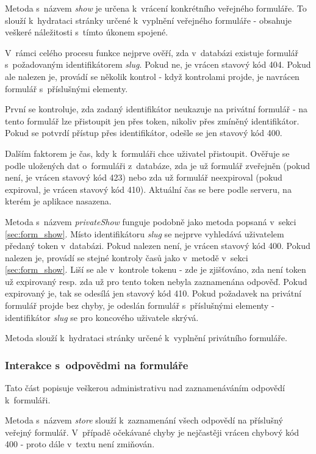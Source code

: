 			\label{sec:form_show}
			Metoda s~názvem \textit{show} je určena k~vrácení konkrétního veřejného formuláře. To slouží k~hydrataci stránky určené k~vyplnění veřejného formuláře - obsahuje veškeré náležitosti s~tímto úkonem spojené.
			
			V~rámci celého procesu funkce nejprve ověří, zda v~databázi existuje formulář s~požadovaným identifikátorem \textit{slug}. Pokud ne, je vrácen stavový kód 404. Pokud ale nalezen je, provádí se několik kontrol - když kontrolami projde, je navrácen formulář s~příslušnými elementy.
			
			První se kontroluje, zda zadaný identifikátor neukazuje na privátní formulář - na tento formulář lze přistoupit jen přes token, nikoliv přes zmíněný identifikátor. Pokud se potvrdí přístup přes identifikátor, odešle se jen stavový kód 400.
			
			Dalším faktorem je čas, kdy k~formuláři chce uživatel přistoupit. Ověřuje se podle uložených dat o~formuláři z~databáze, zda je už formulář zveřejněn (pokud není, je vrácen stavový kód 423) nebo zda už formulář neexpiroval (pokud expiroval, je vrácen stavový kód 410). Aktuální čas se bere podle serveru, na kterém je aplikace nasazena.
			
			\label{sec:form_privateshow}
			Metoda s~názvem \textit{privateShow} funguje podobně jako metoda popsaná v~sekci \ref{sec:form_show}. Místo identifikátoru \textit{slug} se nejprve vyhledává uživatelem předaný token v~databázi. Pokud nalezen není, je vrácen stavový kód 400. Pokud nalezen je, provádí se stejné kontroly časů jako v~metodě v~sekci \ref{sec:form_show}. Liší se ale v~kontrole tokenu - zde je zjišťováno, zda není token už expirovaný resp. zda už pro tento token nebyla zaznamenána odpověď. Pokud expirovaný je, tak se odesílá jen stavový kód 410. Pokud požadavek na privátní formulář projde bez chyby, je odeslán formulář s~příslušnými elementy - identifikátor \textit{slug} se pro koncového uživatele skrývá.
			
			Metoda slouží k~hydrataci stránky určené k~vyplnění privátního formuláře.
		\subsubsection{Interakce s~odpovědmi na formuláře}
		Tato část popisuje veškerou administrativu nad zaznamenáváním odpovědí k~formuláři.
		
			\label{sec:form_comp_public}
			Metoda s~názvem \textit{store} slouží k~zaznamenání všech odpovědí na příslušný veřejný formulář. V~případě očekávané chyby je nejčastěji vrácen chybový kód 400 - proto dále v~textu není zmiňován.
			
